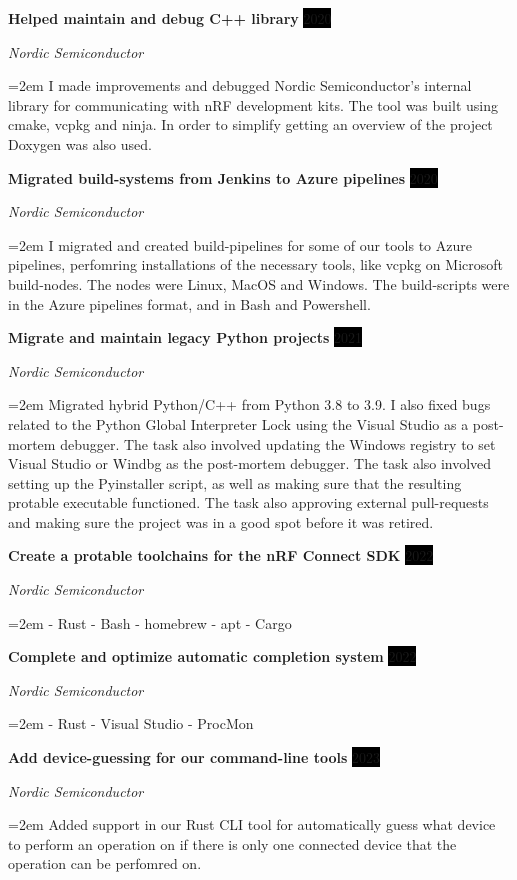 \documentclass[paper=a4,fontsize=11pt,norsk]{scrartcl} %
\newcommand{\EducationEntry}[4]{
		\noindent \textbf{#1} \hfill      %
		\colorbox{Black}{%
			\parbox{6em}{%
			\hfill\color{White}#2}} \par  %
		\noindent \textit{#3} \par        %
		\noindent\hangindent=2em\hangafter=0 \small #4 %
		\normalsize \par}
\newcommand{\WorkEntry}[4]{				  %
		\noindent \textbf{#1} \hfill      %
		\colorbox{Black}{\color{White}#2} \par  %
		\noindent \textit{#3} \par              %
		\noindent\hangindent=2em\hangafter=0 \small #4 %
		\normalsize \par}
\begin{document}




\WorkEntry{Helped maintain and debug C++ library}{2020}{Nordic Semiconductor} {
I made improvements and debugged Nordic Semiconductor's internal library for
communicating with nRF development kits. The tool was built using cmake, vcpkg
and ninja. In order to simplify getting an overview of the project Doxygen was
also used.
}


\WorkEntry{Migrated build-systems from Jenkins to Azure pipelines}{2020}{Nordic Semiconductor}
{I migrated and created build-pipelines for some of our tools to Azure
pipelines, perfomring installations of the necessary tools, like vcpkg on
Microsoft build-nodes. The nodes were Linux, MacOS and Windows. The
build-scripts were in the Azure pipelines format, and in Bash and Powershell.
}



\WorkEntry{Migrate and maintain legacy Python projects}{2021}{Nordic Semiconductor}
{Migrated hybrid Python/C++ from Python 3.8 to 3.9. I also fixed bugs related to
the Python Global Interpreter Lock using the Visual Studio as a post-mortem
debugger. The task also involved updating the Windows registry to set Visual
Studio or Windbg as the post-mortem debugger. The task also involved setting up
the Pyinstaller script, as well as making sure that the resulting protable
executable functioned. The task also approving external pull-requests and
making sure the project was in a good spot before it was retired.
}



\WorkEntry{Create a protable toolchains for the nRF Connect SDK}{2022}{Nordic Semiconductor}
{
- Rust
- Bash
- homebrew
- apt
- Cargo
}

\WorkEntry{Complete and optimize automatic completion system}{2022}{Nordic Semiconductor}
{
- Rust
- Visual Studio
- ProcMon
}


\WorkEntry{Add device-guessing for our command-line tools}{2023}{Nordic Semiconductor}
{Added support in our Rust CLI tool for automatically guess what device to
perform an operation on if there is only one connected device that the operation can be perfomred on.
}
\end{document}
